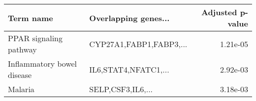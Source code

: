 \begin{tabular}{llr}
\toprule
                 Term name &    Overlapping genes... &  Adjusted p-value \\
\midrule
    PPAR signaling pathway & CYP27A1,FABP1,FABP3,... &          1.21e-05 \\
Inflammatory bowel disease &    IL6,STAT4,NFATC1,... &          2.92e-03 \\
                   Malaria &       SELP,CSF3,IL6,... &          3.18e-03 \\
\bottomrule
\end{tabular}
